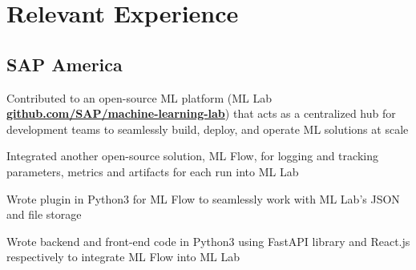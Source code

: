 \documentclass[]{deedy-resume-openfont}
\begin{document}
\begin{minipage}[t]{0.66\textwidth}


    \section{Relevant Experience}
    
    \subsection{SAP America}
    \vspace{\topsep} %
    \begin{tightemize}
        \item Contributed to an open-source ML platform (ML Lab \textbf{\href{https://github.com/SAP/machine-learning-lab}{github.com/SAP/machine-learning-lab}}) that acts as a centralized hub for development teams to seamlessly build, deploy, and operate ML solutions at scale
        \item Integrated another open-source solution, ML Flow, for logging and tracking parameters, metrics and artifacts for each run into ML Lab
        \item Wrote plugin in Python3 for ML Flow to seamlessly work with ML Lab's JSON and file storage
        \item Wrote backend and front-end code in Python3 using FastAPI library and React.js respectively to integrate ML Flow into ML Lab
    \end{tightemize}
    \sectionsep


\end{minipage}
\end{document}
